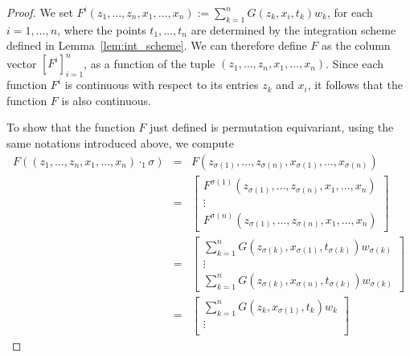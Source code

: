 \documentclass[10pt,a4paper]{amsart}
\begin{document}
\begin{proof}
        We set $F^i(z_1, \ldots, z_n,x_1,\ldots, x_n) := \sum_{k=1}^n G(z_k,x_i,t_k)w_k$, for each $i=1,\ldots , n$, where the points $t_1, \ldots, t_n$ are determined by the integration scheme defined in Lemma~\ref{lem:int_scheme}. 
        We can therefore define $F$ as the column vector $[F^i]_{i=1}^n$, as a function of the tuple $(z_1, \ldots, z_n, x_1, \ldots, x_n)$. Since each function $F^i$ is continuous with respect to its entries $z_k$ and $x_i$, it follows that the function $F$ is also continuous. 
        
        To show that the function $F$ just defined is permutation equivariant, using the same notations introduced above, we compute
        \begin{eqnarray*}
                F( (z_1, \ldots, z_n, x_1, \ldots, x_n)\cdot_1 \sigma) &=& F(z_{\sigma(1)}, \ldots, z_{\sigma(n)}, x_{\sigma(1)}, \ldots, x_{\sigma(n)})\\
                &=& \begin{bmatrix}
             F^{\sigma(1)}(z_{\sigma(1)}, \ldots, z_{\sigma(n)},x_{1}, \ldots, x_{n})\\
                \vdots\\
            F^{\sigma(n)}(z_{\sigma(1)}, \ldots, z_{\sigma(n)},x_{1}, \ldots, x_{n})
              \end{bmatrix}\\
          &=&  \begin{bmatrix}
                    \sum_{k=1}^n G(z_{\sigma(k)},x_{\sigma(1)},t_{\sigma(k)})w_{\sigma(k)}\\
                    \vdots\\
                    \sum_{k=1}^n G(z_{\sigma(k)},x_{\sigma(n)},t_{\sigma(k)})w_{\sigma(k)}
               \end{bmatrix}\\
          &=&  \begin{bmatrix}
                    \sum_{k=1}^n G(z_k,x_{\sigma(1)},t_k)w_k\\
                    \vdots\\

\end{bmatrix}
\end{eqnarray*}
\end{proof}
\end{document}
